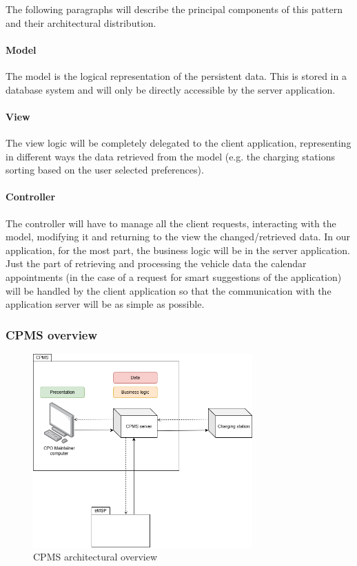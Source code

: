 The following paragraphs will describe the principal components of this pattern and their architectural distribution.

\paragraph{Model}
The model is the logical representation of the persistent data. This is stored in a database system and will only be directly accessible by the server application.

\paragraph{View}
The view logic will be completely delegated to the client application, representing in different ways the data retrieved from the model (e.g. the charging stations sorting based on the user selected preferences).

\paragraph{Controller}
The controller will have to manage all the client requests, interacting with the model, modifying it and returning to the view the changed/retrieved data.
In our application, for the most part, the business logic will be in the server application. Just the part of retrieving and processing the vehicle data the calendar appointments (in the case of a request for smart suggestions of the application) will be handled by the client application so that the communication with the application server will be as simple as possible.

\subsubsection{\ac{CPMS} overview}

\begin{figure}[!h]
    \begin{center}
        \includegraphics[keepaspectratio, width=0.75\textwidth]{Graphics/DD-CPMS-overview.drawio.png}
        \caption{\ac{CPMS} architectural overview}
        \label{fig:CPMS-overview-architecture}
    \end{center}
\end{figure}

